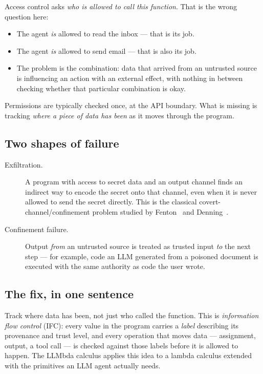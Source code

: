 \documentclass[11pt, a4paper]{article}
\begin{document}
Access control asks \emph{who is allowed to call this function}. That is
the wrong question here:

\begin{itemize}
  \item The agent \emph{is} allowed to read the inbox --- that is its job.
  \item The agent \emph{is} allowed to send email --- that is also its job.
  \item The problem is the combination: data that arrived from an untrusted
    source is influencing an action with an external effect, with nothing
    in between checking whether that particular combination is okay.
\end{itemize}

Permissions are typically checked once, at the API boundary. What is
missing is tracking \emph{where a piece of data has been} as it moves
through the program.

\subsection{Two shapes of failure}

\begin{description}
  \item[Exfiltration.] A program with access to secret data and an output
    channel finds an indirect way to encode the secret onto that channel,
    even when it is never allowed to send the secret directly. This is the
    classical covert-channel/confinement problem studied by
    Fenton~\cite{fenton1974} and Denning~\cite{denning1976}.
  \item[Confinement failure.] Output \emph{from} an untrusted source is
    treated as trusted input \emph{to} the next step --- for example, code
    an LLM generated from a poisoned document is executed with the same
    authority as code the user wrote.
\end{description}

\subsection{The fix, in one sentence}

Track where data has been, not just who called the function. This is
\emph{information flow control} (IFC): every value in the program carries
a \emph{label} describing its provenance and trust level, and every
operation that moves data --- assignment, output, a tool call --- is
checked against those labels before it is allowed to happen. The LLMbda
calculus applies this idea to a lambda calculus extended with the
primitives an LLM agent actually needs.
\end{document}
